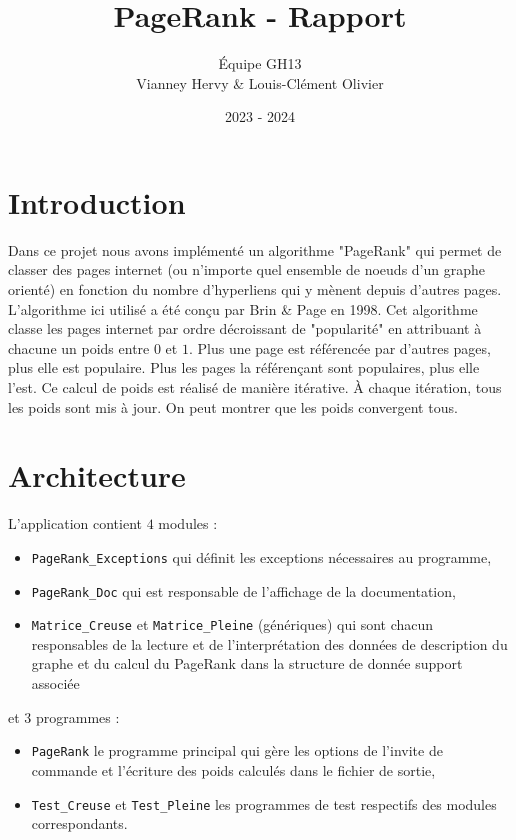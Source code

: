 \documentclass{article}
\title{PageRank - Rapport}
\author{Équipe GH13 \\ Vianney Hervy \& Louis-Clément Olivier}
\date{2023 - 2024}
\begin{document}
\maketitle
\newpage

\tableofcontents

\newpage

\section{Introduction}

Dans ce projet nous avons implémenté un algorithme "PageRank" qui permet de classer des pages internet (ou n'importe quel ensemble de noeuds d'un graphe orienté) en fonction du nombre d'hyperliens qui y mènent depuis d'autres pages. L'algorithme ici utilisé a été conçu par Brin \& Page en 1998. Cet algorithme classe les pages internet par ordre décroissant de "popularité" en attribuant à chacune un poids entre $0$ et $1$. Plus une page est référencée par d'autres pages, plus elle est populaire. Plus les pages la référençant sont populaires, plus elle l'est. Ce calcul de poids est réalisé de manière itérative. À chaque itération, tous les poids sont mis à jour. On peut montrer que les poids convergent tous.

\section{Architecture}

L'application contient $4$ modules :
\begin{itemize}
    \item \texttt{PageRank\_Exceptions} qui définit les exceptions nécessaires au programme,
    \item \texttt{PageRank\_Doc} qui est responsable de l'affichage de la documentation,
    \item \texttt{Matrice\_Creuse} et \texttt{Matrice\_Pleine} (génériques) qui sont chacun responsables de la lecture et de l'interprétation des données de description du graphe et du calcul du PageRank dans la structure de donnée support associée
\end{itemize}

\noindent et $3$ programmes :
\begin{itemize}
    \item \texttt{PageRank} le programme principal qui gère les options de l'invite de commande et l'écriture des poids calculés dans le fichier de sortie,
    \item \texttt{Test\_Creuse} et \texttt{Test\_Pleine} les programmes de test respectifs des modules correspondants.
\end{itemize}
\end{document}
